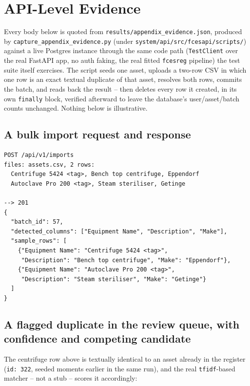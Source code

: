 \documentclass[11pt]{article}
\begin{document}


\section{API-Level Evidence}
\label{sec:api-evidence}

Every body below is quoted from \texttt{results/\allowbreak{}appendix\_\allowbreak{}evidence.json},
produced by \texttt{capture\_\allowbreak{}appendix\_\allowbreak{}evidence.py} (under
\texttt{system/\allowbreak{}api/\allowbreak{}src/\allowbreak{}fcesapi/\allowbreak{}scripts/\allowbreak{}})
against a live Postgres instance through the same code path (\texttt{TestClient} over the real
FastAPI app, no auth faking, the real fitted \texttt{fcesreg} pipeline) the test suite itself
exercises. The script
seeds one asset, uploads a two-row CSV in which one row is an exact textual duplicate of that
asset, resolves both rows, commits the batch, and reads back the result -- then deletes every
row it created, in its own \texttt{finally} block, verified afterward to leave the database's
user/asset/batch counts unchanged. Nothing below is illustrative.

\subsection{A bulk import request and response}

\begin{verbatim}
POST /api/v1/imports
files: assets.csv, 2 rows:
  Centrifuge 5424 <tag>, Bench top centrifuge, Eppendorf
  Autoclave Pro 200 <tag>, Steam steriliser, Getinge

--> 201
{
  "batch_id": 57,
  "detected_columns": ["Equipment Name", "Description", "Make"],
  "sample_rows": [
    {"Equipment Name": "Centrifuge 5424 <tag>",
     "Description": "Bench top centrifuge", "Make": "Eppendorf"},
    {"Equipment Name": "Autoclave Pro 200 <tag>",
     "Description": "Steam steriliser", "Make": "Getinge"}
  ]
}
\end{verbatim}

\subsection{A flagged duplicate in the review queue, with confidence and competing candidate}

The centrifuge row above is textually identical to an asset already in the register
(\texttt{id: 322}, seeded moments earlier in the same run), and the real \texttt{tfidf}-based
matcher -- not a stub -- scores it accordingly:
\end{document}
